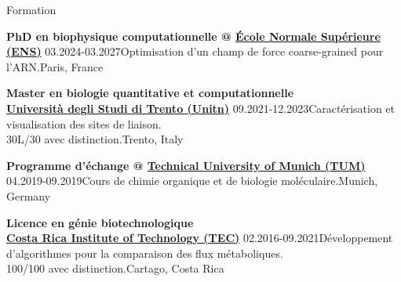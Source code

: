 \begin{rSection}{Formation}
    \vspace{\baselineskip}

    \begin{rSubsectionShort}{
        \bf PhD en biophysique computationnelle @ \href{https://www.lpens.ens.psl.eu/}{École Normale Supérieure (ENS)}
    }{03.2024-03.2027}{Optimisation d'un champ de force coarse-grained pour l'ARN.}{Paris, France}
    \end{rSubsectionShort}

    \begin{rSubsectionShort}{
        \bf Master en biologie quantitative et computationnelle \\\@ \href{https://www.unitn.it/}{Università degli Studi di Trento (Unitn)}
    }{09.2021-12.2023}{Caractérisation et visualisation des sites de liaison. \\30L/30 avec distinction.}{Trento, Italy}
    \end{rSubsectionShort}

    \begin{rSubsectionShort}{
        \bf Programme d'échange @ \href{https://www.tum.de/en/}{Technical University of Munich (TUM)}
    }{04.2019-09.2019}{Cours de chimie organique et de biologie moléculaire.}{Munich, Germany}
    \end{rSubsectionShort}

    \begin{rSubsectionShort}{
        \bf Licence en génie biotechnologique \\\@ \href{https://www.tec.ac.cr/}{Costa Rica Institute of Technology (TEC)}
    }{02.2016-09.2021}{Développement d'algorithmes pour la comparaison des flux métaboliques. \\100/100 avec distinction.}{Cartago, Costa Rica}
    \end{rSubsectionShort}

\end{rSection}



